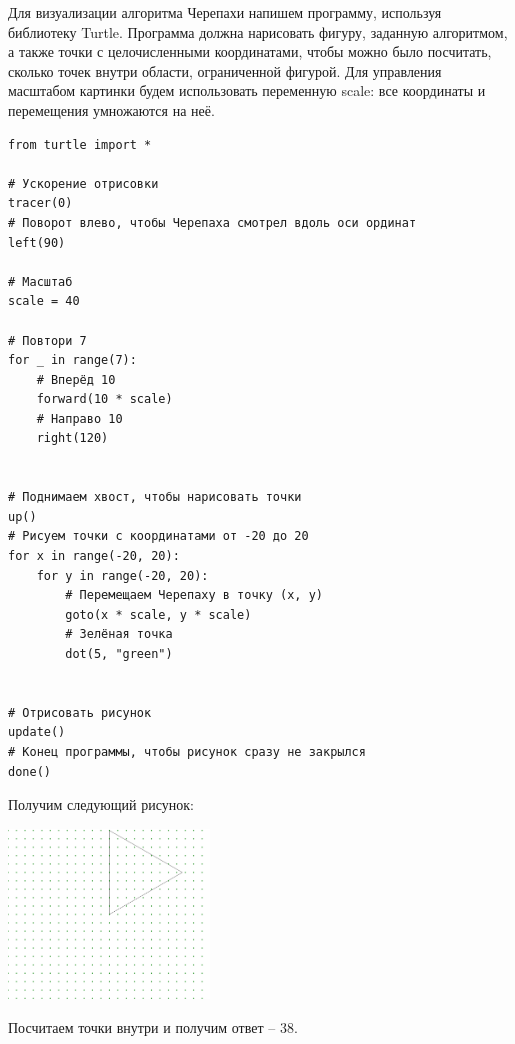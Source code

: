 \documentclass[14pt,a4paper]{article}
\begin{document}
Для визуализации алгоритма Черепахи напишем программу, используя библиотеку Turtle. Программа должна нарисовать фигуру, заданную алгоритмом, а также точки с целочисленными координатами, чтобы можно было посчитать, сколько точек внутри области, ограниченной фигурой. Для управления масштабом картинки будем использовать переменную scale: все координаты и перемещения умножаются на неё.

\begin{verbatim}
from turtle import *

# Ускорение отрисовки
tracer(0)
# Поворот влево, чтобы Черепаха смотрел вдоль оси ординат
left(90)

# Масштаб
scale = 40

# Повтори 7
for _ in range(7):
    # Вперёд 10
    forward(10 * scale)
    # Направо 10
    right(120)


# Поднимаем хвост, чтобы нарисовать точки
up()
# Рисуем точки с координатами от -20 до 20
for x in range(-20, 20):
    for y in range(-20, 20):
        # Перемещаем Черепаху в точку (x, y)
        goto(x * scale, y * scale)
        # Зелёная точка
        dot(5, "green")


# Отрисовать рисунок
update()
# Конец программы, чтобы рисунок сразу не закрылся
done()
\end{verbatim}

Получим следующий рисунок:
\begin{center}
    \includegraphics[width=0.4\textwidth]{figure.png}
\end{center}

Посчитаем точки внутри и получим ответ -- 38.
\end{document}
